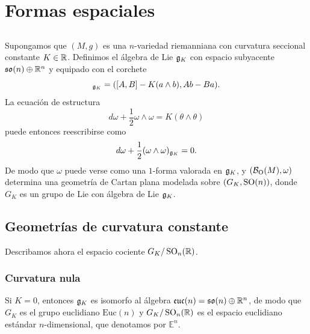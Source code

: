 \documentclass[11pt,a4paper]{amsbook}
\theoremstyle{remark} \newtheorem{rmk}[subsection]{Observación}
\theoremstyle{definition} \newtheorem{defn}[subsection]{Definición}
\theoremstyle{definition} \newtheorem{ex}[subsection]{Ejemplo}
\theoremstyle{definition} \newtheorem{ej}[subsection]{Ejercicio}
\begin{document}
\section{Formas espaciales}
\subsection{} Supongamos que $(M,g)$ es una $n$-variedad riemanniana con curvatura seccional constante $K\in \mathbb R$. Definimos el álgebra de Lie $\mathfrak{g}_K$ con espacio subyacente $\mathfrak{so}(n)\oplus \mathbb R^n$ y equipado con el corchete
\begin{equation*}
[(A,a),(B,b)]_{\fg_K} =([A,B] - K (a\wedge b), A b - Ba).
\end{equation*}
La ecuación de estructura
\begin{equation*}
d\omega + \frac{1}{2}\omega \wedge \omega = K(\theta \wedge \theta)
\end{equation*}
puede entonces reescribirse como
\begin{equation*}
d\omega + \frac{1}{2}(\omega \wedge \omega)_{\mathfrak{g}_K} = 0.
\end{equation*}
De modo que $\omega$ puede verse como una $1$-forma valorada en $\mathfrak{g}_K$, y $(\mathcal B_{\operatorname{O}}(M),\omega)$ determina una geometría de Cartan plana modelada sobre $(G_K,\operatorname{SO}(n))$, donde $G_K$ es un grupo de Lie con álgebra de Lie $\mathfrak{g}_K$.

\subsection{Geometrías de curvatura constante} Describamos ahora el espacio cociente $G_K/\operatorname{SO}_n(\mathbb R)$.
\subsubsection{Curvatura nula} Si $K=0$, entonces $\mathfrak{g}_K$ es isomorfo al álgebra $\mathfrak{euc}(n) = \mathfrak{so}(n)\oplus \mathbb R^n$, de modo que $G_K$ es el grupo euclidiano $\mathrm{Euc}(n)$ y $G_K/\operatorname{SO}_n(\mathbb R)$ es el espacio euclidiano estándar $n$-dimensional, que denotamos por $\mathbb{E}^n$.
\end{document}
